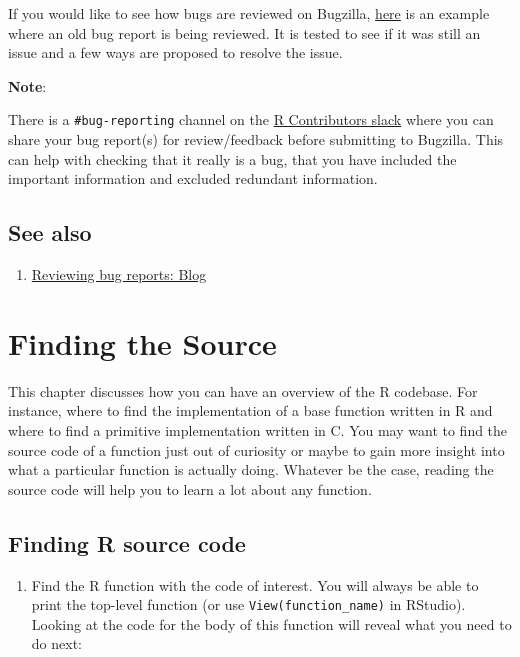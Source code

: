 \documentclass[
]{book}
\providecommand{\tightlist}{%
  \setlength{\itemsep}{0pt}\setlength{\parskip}{0pt}}
\begin{document}
If you would like to see how bugs are reviewed on Bugzilla, \href{https://bugs.r-project.org/bugzilla/show_bug.cgi?id=16542}{here} is an example where an old bug report is being reviewed. It is tested to see if it was still an issue and a few ways are proposed to resolve the issue.

\textbf{Note}:

There is a \texttt{\#bug-reporting} channel on the \href{https://r-contributors.slack.com/}{R Contributors slack} where you can share your bug report(s) for review/feedback before submitting to Bugzilla. This can help with checking that it really is a bug, that you have included the important information and excluded redundant information.

\hypertarget{see-also-2}{%
\section{See also}\label{see-also-2}}

\begin{enumerate}
\def\labelenumi{\arabic{enumi}.}
\tightlist
\item
  \href{https://blog.r-project.org/2019/10/09/r-can-use-your-help-reviewing-bug-reports/index.html}{Reviewing bug reports: Blog}
\end{enumerate}

\hypertarget{FindSource}{%
\chapter{Finding the Source}\label{FindSource}}

This chapter discusses how you can have an overview of the R codebase. For instance, where to find the implementation of a base function written in R and where to find a primitive implementation written in C. You may want to find the source code of a function just out of curiosity or maybe to gain more insight into what a particular function is actually doing. Whatever be the case, reading the source code will help you to learn a lot about any function.

\hypertarget{finding-r-source-code}{%
\section{Finding R source code}\label{finding-r-source-code}}

\begin{enumerate}
\def\labelenumi{\arabic{enumi}.}
\tightlist
\item
  Find the R function with the code of interest. You will always be able to print the top-level function (or use \texttt{View(function\_name)} in RStudio). Looking at the code for the body of this function will reveal what you need to do next:
\end{enumerate}
\end{document}
